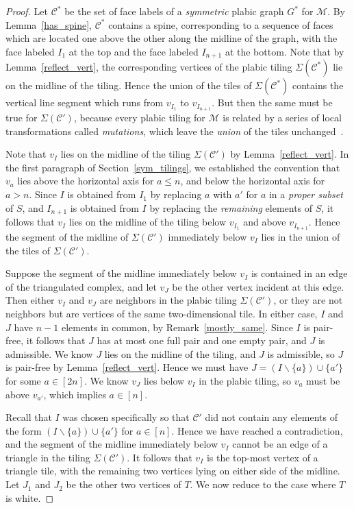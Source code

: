 \documentclass[ALCO,ThmDefs,Unicode,epreuves]{cedram}
\begin{document}
\begin{proof}
Let $\mathcal{C}^*$ be the set of face labels of a \emph{symmetric} plabic graph $G^*$ for $\mathcal{M}$. By Lemma~\ref{has_spine}, $\mathcal{C}^*$ contains a spine, corresponding to a sequence of faces which are located one above the other along the midline of the graph, with the face labeled $I_1$ at the top and the face labeled $I_{n+1}$ at the bottom. Note that by Lemma~\ref{reflect_vert}, the corresponding vertices of the plabic tiling $\Sigma(\mathcal{C}^*)$ lie on the midline of the tiling. Hence the union of the tiles of $\Sigma(\mathcal{C}^*)$ contains the vertical line segment which runs from $v_{I_1}$ to $v_{I_{n+1}}$. But then the same must be true for $\Sigma(\mathcal{C}')$, because every plabic tiling for $\mathcal{M}$ is related by a series of local transformations called \emph{mutations}, which leave the \emph{union} of the tiles unchanged~\cite{OPS15}. 

Note that $v_I$ lies on the midline of the tiling $\Sigma(\mathcal{C}')$ by Lemma~\ref{reflect_vert}. In the first paragraph of Section~\ref{sym_tilings}, we established the convention that $v_a$ lies above the horizontal axis for $a \leq n$, and below the horizontal axis for $a > n$. Since $I$ is obtained from $I_1$ by replacing $a$ with $a'$ for $a$ in a \emph{proper subset} of $S$, and $I_{n+1}$ is obtained from $I$ by replacing the \emph{remaining} elements of $S$, it follows that $v_I$ lies on the midline of the tiling below $v_{I_1}$ and above $v_{I_{n+1}}$. Hence the segment of the midline of $\Sigma(\mathcal{C}')$ immediately below $v_I$ lies in the union of the tiles of $\Sigma(\mathcal{C}')$.

Suppose the segment of the midline immediately below $v_I$ is contained in an edge of the triangulated complex, and let $v_J$ be the other vertex incident at this edge. Then either $v_I$ and $v_J$ are neighbors in the plabic tiling $\Sigma(\mathcal{C}')$, or they are not neighbors but are vertices of the same two-dimensional tile. In either case, $I$ and $J$ have $n-1$ elements in common, by Remark~\ref{mostly_same}. Since $I$ is pair-free, it follows that $J$ has at most one full pair and one empty pair, and $J$ is admissible. We know $J$ lies on the midline of the tiling, and $J$ is admissible, so $J$ is pair-free by Lemma~\ref{reflect_vert}. Hence we must have $J = (I \backslash \{a\}) \cup \{a'\}$ for some $a \in [2n]$. We know $v_J$ lies below $v_I$ in the plabic tiling, so $v_a$ must be above $v_{a'}$, which implies $a \in [n]$.

Recall that $I$ was chosen specifically so that $\mathcal{C}'$ did not contain any elements of the form $(I \backslash \{a\}) \cup \{a'\}$ for $a \in [n]$. Hence we have reached a contradiction, and the segment of the midline immediately below $v_I$ cannot be an edge of a triangle in the tiling $\Sigma(\mathcal{C}')$. It follows that $v_I$ is the top-most vertex of a triangle tile, with the remaining two vertices lying on either side of the midline. Let $J_1$ and $J_2$ be the other two vertices of $T$. We now reduce to the case where $T$ is white. 


\end{proof}
\end{document}
